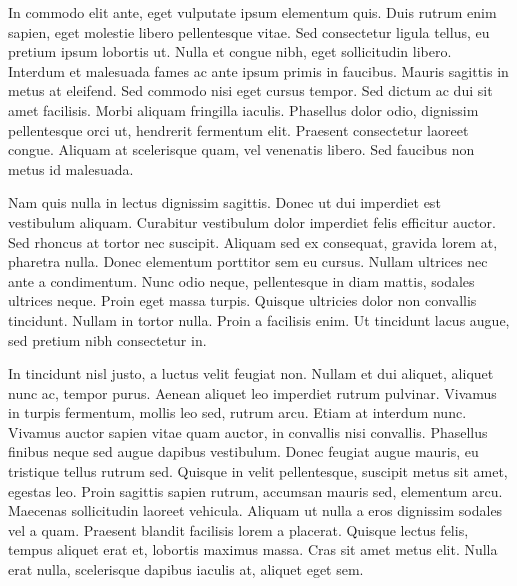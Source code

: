 In commodo elit ante, eget vulputate ipsum elementum quis. Duis rutrum enim sapien, eget molestie libero pellentesque vitae. Sed consectetur ligula tellus, eu pretium ipsum lobortis ut. Nulla et congue nibh, eget sollicitudin libero. Interdum et malesuada fames ac ante ipsum primis in faucibus. Mauris sagittis in metus at eleifend. Sed commodo nisi eget cursus tempor. Sed dictum ac dui sit amet facilisis. Morbi aliquam fringilla iaculis. Phasellus dolor odio, dignissim pellentesque orci ut, hendrerit fermentum elit. Praesent consectetur laoreet congue. Aliquam at scelerisque quam, vel venenatis libero. Sed faucibus non metus id malesuada.

Nam quis nulla in lectus dignissim sagittis. Donec ut dui imperdiet est vestibulum aliquam. Curabitur vestibulum dolor imperdiet felis efficitur auctor. Sed rhoncus at tortor nec suscipit. Aliquam sed ex consequat, gravida lorem at, pharetra nulla. Donec elementum porttitor sem eu cursus. Nullam ultrices nec ante a condimentum. Nunc odio neque, pellentesque in diam mattis, sodales ultrices neque. Proin eget massa turpis. Quisque ultricies dolor non convallis tincidunt. Nullam in tortor nulla. Proin a facilisis enim. Ut tincidunt lacus augue, sed pretium nibh consectetur in.

In tincidunt nisl justo, a luctus velit feugiat non. Nullam et dui aliquet, aliquet nunc ac, tempor purus. Aenean aliquet leo imperdiet rutrum pulvinar. Vivamus in turpis fermentum, mollis leo sed, rutrum arcu. Etiam at interdum nunc. Vivamus auctor sapien vitae quam auctor, in convallis nisi convallis. Phasellus finibus neque sed augue dapibus vestibulum. Donec feugiat augue mauris, eu tristique tellus rutrum sed. Quisque in velit pellentesque, suscipit metus sit amet, egestas leo. Proin sagittis sapien rutrum, accumsan mauris sed, elementum arcu. Maecenas sollicitudin laoreet vehicula. Aliquam ut nulla a eros dignissim sodales vel a quam. Praesent blandit facilisis lorem a placerat. Quisque lectus felis, tempus aliquet erat et, lobortis maximus massa. Cras sit amet metus elit. Nulla erat nulla, scelerisque dapibus iaculis at, aliquet eget sem.
